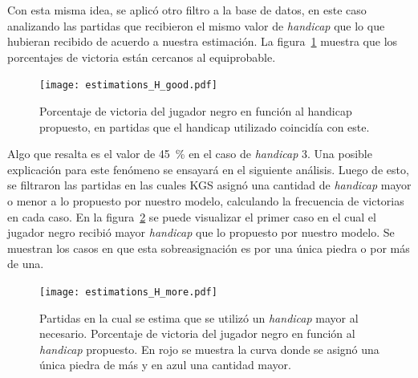 \documentclass[11pt,twoside,spanish]{report} %
\begin{document}
Con esta misma idea, se aplic\'o otro filtro a la base de datos, en este caso analizando las partidas que recibieron el mismo valor de \textit{handicap} que lo que hubieran recibido de acuerdo a nuestra estimaci\'on.
La figura~\ref{fig:handicap_porcentaje_bien} muestra que los porcentajes de victoria est\'an cercanos al equiprobable.

\begin{figure}[H]
    \centering
    \texttt{[image: estimations\_H\_good.pdf]}
    \caption{Porcentaje de victoria del jugador negro en funci\'on al handicap propuesto, en partidas que el handicap utilizado coincid\'ia con este.}
    \label{fig:handicap_porcentaje_bien}
\end{figure}


Algo que resalta es el valor de \SI{45}{\percent} en el caso de \textit{handicap} 3.
Una posible explicaci\'on para este fen\'omeno se ensayar\'a  en el siguiente an\'alisis.
Luego de esto, se filtraron las partidas en las cuales KGS asign\'o una cantidad de \textit{handicap} mayor o menor a lo propuesto por nuestro modelo, calculando la frecuencia de victorias en cada caso.
En la figura~\ref{fig:handicap_porcentaje_de_mas} se puede visualizar el primer caso en el cual el jugador negro recibi\'o mayor \textit{handicap} que lo propuesto por nuestro modelo. 
Se muestran los casos en que esta sobreasignaci\'on es por una \'unica piedra o por m\'as de una.


\begin{figure}[H]
    \centering
    \texttt{[image: estimations\_H\_more.pdf]}
    \caption{Partidas en la cual se estima que se utiliz\'o un \textit{handicap} mayor al necesario. Porcentaje de victoria del jugador negro en funci\'on al \textit{handicap} propuesto. En rojo se muestra la curva donde se asign\'o  una \'unica piedra de m\'as y en azul una cantidad mayor. }
    \label{fig:handicap_porcentaje_de_mas}
\end{figure}
\end{document}
